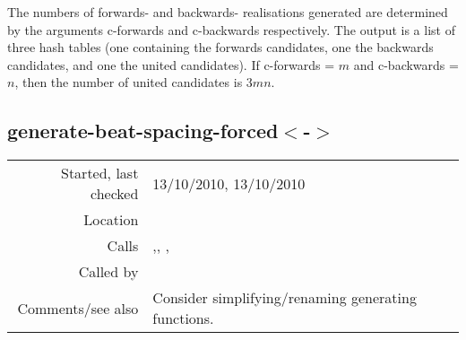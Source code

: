 The numbers of forwards- and backwards- realisations
generated are determined by the arguments c-forwards
and c-backwards respectively. The output is a list of
three hash tables (one containing the forwards
candidates, one the backwards candidates, and one the
united candidates). If c-forwards = $m$ and
c-backwards = $n$, then the number of united
candidates is $3mn$.


\subsection*{generate-beat-spacing-forced$<$-$>$}\label{fun:generate-beat-spacing-forced<->}

\vspace{0.3cm}
\begin{tabular}{r|p{8cm}}
Started, last checked & 13/10/2010, 13/10/2010 \\
Location & \nameref{sec:generating-beat-MNN-spacing-for-and-back} \\
Calls & \nameref{fun:generate-forced<->no-failure},\newline \nameref{fun:generate-forwards-or-backwards-no-failure}, \nameref{fun:segments-strict}, \nameref{fun:unite-datapoints} \\
Called by & \\
Comments/see also & Consider simplifying/renaming generating functions.
\end{tabular}

